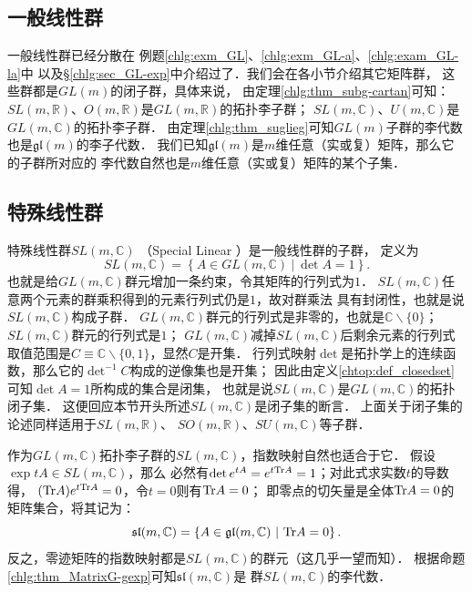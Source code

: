 \subsection{一般线性群} %
一般线性群已经分散在
例题\ref{chlg:exm_GL}、\ref{chlg:exm_GL-a}、\ref{chlg:exam_GL-la}中
以及\S\ref{chlg:sec_GL-exp}中介绍过了．我们会在各小节介绍其它矩阵群，
这些群都是$GL(m)$的闭子群，具体来说，
由定理\ref{chlg:thm_subg-cartan}可知：
$SL(m,\mathbb{R})$、$O(m,\mathbb{R})$是$GL(m,\mathbb{R})$的拓扑李子群；
$SL(m,\mathbb{C})$、$U(m,\mathbb{C})$是$GL(m,\mathbb{C})$的拓扑李子群．
由定理\ref{chlg:thm_suglieg}可知$GL(m)$子群的李代数也是$\mathfrak{gl}(m)$的李子代数．
我们已知$\mathfrak{gl}(m)$是$m$维任意（实或复）矩阵，那么它的子群所对应的
李代数自然也是$m$维任意（实或复）矩阵的某个子集．






\subsection{特殊线性群}\label{chlg:sec_SL}
特殊线性群$SL(m,\mathbb{C})$ （Special Linear ）是一般线性群的子群，
定义为
\begin{equation}
    SL(m,\mathbb{C}) = \left\{ A \in GL(m,\mathbb{C})\ |\ \det A =1 \right\} .
\end{equation}
也就是给$GL(m,\mathbb{C})$群元增加一条约束，令其矩阵的行列式为$1$．
$SL(m,\mathbb{C})$任意两个元素的群乘积得到的元素行列式仍是$1$，故对群乘法
具有封闭性，也就是说$SL(m,\mathbb{C})$构成子群．
$GL(m,\mathbb{C})$群元的行列式是非零的，也就是$\mathbb{C}\backslash \{0\}$；
$SL(m,\mathbb{C})$群元的行列式是$1$；
$GL(m,\mathbb{C})$减掉$SL(m,\mathbb{C})$后剩余元素的行列式
取值范围是$C\equiv \mathbb{C}\backslash \{0,1\}$，显然$C$是开集．
行列式映射$\det$是拓扑学上的连续函数，那么它的$\det^{-1}C$构成的逆像集也是开集；
因此由定义\ref{chtop:def_closedset}可知$\det A =1$所构成的集合是{\kaishu 闭集}，
也就是说$SL(m,\mathbb{C})$是$GL(m,\mathbb{C})$的拓扑闭子集．
这便回应本节开头所述$SL(m,\mathbb{C})$是闭子集的断言．
上面关于闭子集的论述同样适用于$SL(m,\mathbb{R})$、
$SO(m,\mathbb{R})$、$SU(m,\mathbb{C})$等子群．


作为$GL(m,\mathbb{C})$拓扑李子群的$SL(m,\mathbb{C})$，指数映射自然也适合于它．
假设$\exp tA \in SL(m,\mathbb{C})$，那么
必然有$\det e^{tA} =e^{t {\rm Tr}A} =1$；对此式求实数$t$的导数得，
$({\rm Tr}A) e^{t {\rm Tr}A} =0$，令$t=0$则有${\rm Tr}A=0$；
即零点的切矢量是全体${\rm Tr}A=0$的矩阵集合，将其记为：
\begin{equation}
    \mathfrak{sl}(m,\mathbb{C})= \left\{A\in\mathfrak{gl}(m,\mathbb{C})\ |\ {\rm Tr} A =0 \right\} .
\end{equation}
反之，零迹矩阵的指数映射都是$SL(m,\mathbb{C})$的群元（这几乎一望而知）．
根据命题\ref{chlg:thm_MatrixG-gexp}可知$\mathfrak{sl}(m,\mathbb{C})$是
群$SL(m,\mathbb{C})$的李代数．

